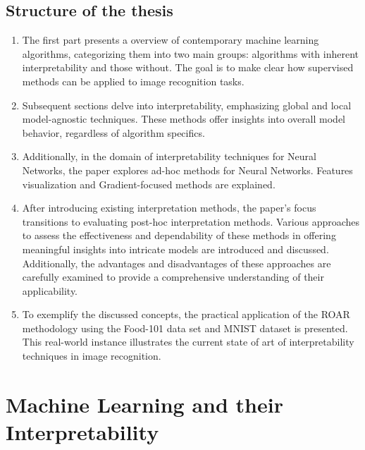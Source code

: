 \newpage
\section{Structure of the thesis}

\begin{enumerate}
	\item The first part presents a overview of contemporary machine learning algorithms, categorizing them into two main groups: algorithms with inherent interpretability and those without. The goal is to make clear how supervised methods can be applied to image recognition tasks.
	\item Subsequent sections delve into interpretability, emphasizing global and local model-agnostic techniques. These methods offer insights into overall model behavior, regardless of algorithm specifics.   
	\item Additionally, in the domain of interpretability techniques for Neural Networks, the paper explores ad-hoc methods for Neural Networks. Features visualization and Gradient-focused methods are explained.
	\item After introducing existing interpretation methods, the paper's focus transitions to evaluating post-hoc interpretation methods. Various approaches to assess the effectiveness and dependability of these methods in offering meaningful insights into intricate models are introduced and discussed. Additionally, the advantages and disadvantages of these approaches are carefully examined to provide a comprehensive understanding of their applicability.
	\item To exemplify the discussed concepts, the practical application of the ROAR methodology using the Food-101 data set \cite{bossard14} and MNIST dataset \cite{deng2012mnist} is presented. This real-world instance illustrates the current state of art of interpretability techniques in image recognition.
\end{enumerate}

\chapter{Machine Learning and their Interpretability}

